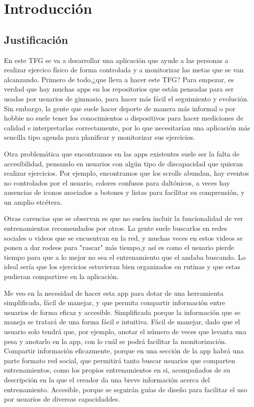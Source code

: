 \chapter{Introducción}

\section{Justificación}

En este TFG se va a desarrollar una aplicación que ayude a las personas a realizar ejercico físico de forma controlada y a monitorizar las metas que se van alcanzando.
Primero de todo,¿que lleva a hacer este TFG? Para empezar, es verdad que hay muchas apps en los repositorios que están pensadas para ser usadas por usuarios de gimnasio, para hacer más fácil el seguimiento y evolución.
Sin embargo, la gente que suele hacer deporte de manera más informal o por hobbie no suele tener los conocimientos o dispositivos para hacer mediciones de calidad e interpretarlas correctamente, por lo que necesitarían una aplicación más sencilla tipo agenda para planificar y monitorizar sus ejercicios. 

Otra problemática que encontramos en las apps existentes suele ser la falta de accesibilidad, pensando en usuarios con algún tipo de discapacidad que quieran realizar ejercicios. Por ejemplo, encontramos que los scrolls abundan, hay eventos no controlados por el usuario, colores confusos para daltónicos, a veces hay ausencias de iconos asociados a botones y listas para facilitar su comprensión, y un amplio etcétera. 

Otras carencias que se observan es que no suelen incluir la funcionalidad de ver entrenamientos recomendados por otros. La gente suele buscarlos en redes sociales o videos que se encuentran en la red, y muchas veces en estos videos se ponen a dar rodeos para "rascar" más tiempo,y así es como el usuario pierde tiempo para que a lo mejor no sea el entrenamiento que el andaba buscando. Lo ideal sería que los ejercicios estuvieran bien organizados en rutinas y que estas pudieran compartirse en la aplicación.

Me veo en la necesidad de hacer esta app para dotar de una herramienta simplificada, fácil de manejar, y que permita compartir información entre usuarios de forma eficaz y accesible. Simplificada porque la información que se maneja se tratará de una forma fácil e intuitiva.
Fácil de manejar, dado que el usuario solo tendrá que, por ejemplo, anotar el número de veces que levanta una pesa y anotarlo en la app, con lo cuál se podrá facilitar la monitorización. Compartir información eficazmente, porque en una sección de la app habrá una parte formato red social, que permitirá tanto buscar usuarios que comparten entrenamientos, como los propios entrenamientos en si, acompañados de su descripción en la que el creador da una breve información acerca del entrenamiento. Accesible, porque se seguirán guías de diseño para facilitar el uso por usuarios de diversas capacidaddes.

